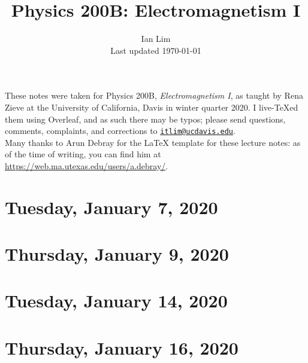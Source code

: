 \documentclass{../mynotes}
\begin{document}
\title{Physics 200B: Electromagnetism I}
\author{Ian Lim\\ Last updated \today}
\maketitle
{\small\noindent These notes were taken for Physics 200B, \emph{Electromagnetism I}, as taught by Rena Zieve at the University of California, Davis in winter quarter 2020. I live-\TeX ed them using Overleaf, and as such there may be typos; please send questions, comments, complaints, and corrections to 
\href{mailto:itlim@ucdavis.edu?subject=200B\%20Lecture\%20Notes}{\texttt{itlim@ucdavis.edu}}.\\
Many thanks to Arun Debray for the {\LaTeX} template for these lecture notes: as of the time of writing, you can find him at \url{https://web.ma.utexas.edu/users/a.debray/}.}

\tableofcontents

\section{Tuesday, January 7, 2020}
	
\section{Thursday, January 9, 2020}
    
    
\section{Tuesday, January 14, 2020}
    
\section{Thursday, January 16, 2020}
    
\end{document}
